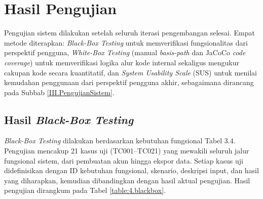 \section{Hasil Pengujian} \label{IV.Hasil_Uji}

Pengujian sistem dilakukan setelah seluruh iterasi pengembangan selesai. Empat metode diterapkan: \textit{Black-Box Testing} untuk memverifikasi fungsionalitas dari perspektif pengguna, \textit{White-Box Testing} (manual \textit{basis-path} dan JaCoCo \textit{code coverage}) untuk memverifikasi logika alur kode internal sekaligus mengukur cakupan kode secara kuantitatif, dan \textit{System Usability Scale} (SUS) untuk menilai kemudahan penggunaan dari perspektif pengguna akhir, sebagaimana dirancang pada Subbab \ref{III.PengujianSistem}.\par

\subsection{Hasil \textit{Black-Box Testing}} \label{IV.HasilBBT}

\textit{Black-Box Testing} dilakukan berdasarkan kebutuhan fungsional Tabel 3.4. Pengujian mencakup 21 kasus uji (TC001--TC021) yang mewakili seluruh jalur fungsional sistem, dari pembuatan akun hingga ekspor data. Setiap kasus uji didefinisikan dengan ID kebutuhan fungsional, skenario, deskripsi input, dan hasil yang diharapkan, kemudian dibandingkan dengan hasil aktual pengujian. Hasil pengujian dirangkum pada Tabel \ref{table:4.blackbox}.\par

